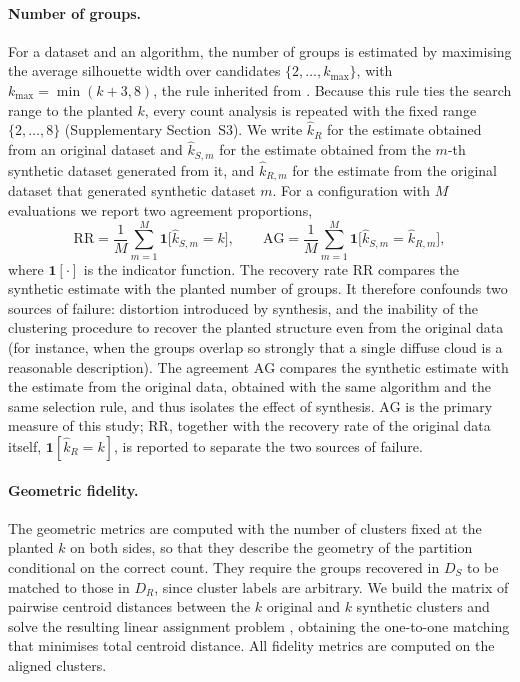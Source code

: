 \documentclass[pdflatex,sn-basic]{sn-jnl}
\newcommand{\ind}{\mathbf{1}}
\begin{document}
\paragraph{Number of groups.}
For a dataset and an algorithm, the number of groups is estimated by maximising
the average silhouette width \citep{rousseeuw1987} over candidates
$\{2,\dots,k_{\max}\}$, with $k_{\max} = \min(k+3, 8)$, the rule inherited
from \citet{chen2025}. Because this rule ties the search range to the planted
$k$, every count analysis is repeated with the fixed range $\{2,\dots,8\}$
(Supplementary Section~S3). We write $\hat{k}_R$ for the estimate obtained from
an original dataset and $\hat{k}_{S,m}$ for the estimate obtained from the
$m$-th synthetic dataset generated from it, and $\hat{k}_{R,m}$ for the
estimate from the original dataset that generated synthetic dataset $m$. For a
configuration with $M$ evaluations we report two agreement proportions,
\begin{equation}
  \mathrm{RR} = \frac{1}{M} \sum_{m=1}^{M}
    \ind\bigl[\hat{k}_{S,m} = k\bigr],
  \qquad
  \mathrm{AG} = \frac{1}{M} \sum_{m=1}^{M}
    \ind\bigl[\hat{k}_{S,m} = \hat{k}_{R,m}\bigr],
  \label{eq:sr}
\end{equation}
where $\ind[\cdot]$ is the indicator function. The recovery rate $\mathrm{RR}$
compares the synthetic estimate with the planted number of groups. It
therefore confounds two sources of failure: distortion introduced by
synthesis, and the inability of the clustering procedure to recover the
planted structure even from the original data (for instance, when the groups
overlap so strongly that a single diffuse cloud is a reasonable description).
The agreement $\mathrm{AG}$ compares the synthetic estimate with the estimate
from the original data, obtained with the same algorithm and the same
selection rule, and thus isolates the effect of synthesis. $\mathrm{AG}$ is the
primary measure of this study; $\mathrm{RR}$, together with the recovery rate
of the original data itself, $\ind[\hat{k}_R = k]$, is reported to separate the
two sources of failure.

\paragraph{Geometric fidelity.}
The geometric metrics are computed with the number of clusters fixed at the
planted $k$ on both sides, so that they describe the geometry of the
partition conditional on the correct count. They require the groups recovered
in $D_S$ to be matched to those in $D_R$, since cluster labels are arbitrary. We
build the matrix of pairwise centroid distances between the $k$ original and
$k$ synthetic clusters and solve the resulting linear assignment problem
\citep{kuhn1955}, obtaining the one-to-one matching that minimises total
centroid distance. All fidelity metrics are computed on the aligned clusters.
\end{document}
